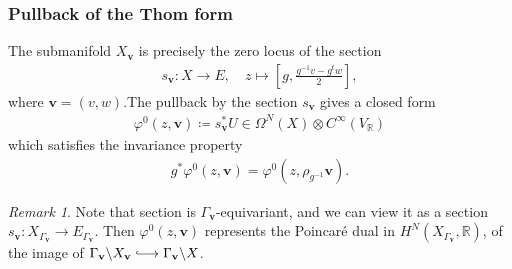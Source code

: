 \documentclass[twoside,a4paper,10pt]{article} %
\newcommand{\8}{\infty}
\newcommand{\vbf}{\mathbf{v}}
\newcommand{\R}{\mathbb{R}}
\newcommand{\hooklongrightarrow}{\lhook\joinrel\longrightarrow}
\theoremstyle{mytheoremstyle}
\theoremstyle{remark}
\newtheorem{rmk}{Remark}[section]
\numberwithin{equation}{section}
\begin{document}
\subsubsection{Pullback of the Thom form}The submanifold $X_\vbf$ is precisely the zero locus of the section
\begin{align} \label{sectionsv}
s_\vbf \colon X \longrightarrow E, \quad z \longmapsto \left [ g,\frac{g^{-1}v-g^t w}{2}\right ],
\end{align}
where $\vbf=(v,w)$.The pullback by the section $s_\vbf$ gives a closed form
\begin{align}
\varphi^0(z,\vbf)\coloneqq s_\vbf^\ast U \in \Omega^N(X) \otimes C^\8(V_\R)
\end{align} 
which satisfies the invariance property
\begin{align}
g^\ast \varphi^0(z,\vbf)=\varphi^0(z,\rho_{g^{-1}}\vbf).
\end{align}
\begin{rmk}
Note that section is $\Gamma_\vbf$-equivariant, and we can view it as a section $s_\vbf \colon X_{\Gamma_\vbf}  \longrightarrow E_{\Gamma_\vbf}$. Then $\varphi^0(z,\vbf)$ represents the Poincaré dual in $H^{N}(X_{\Gamma_\vbf},\R)$, of the image of $\Gamma_\vbf \backslash X_{\vbf} \hooklongrightarrow \Gamma_\vbf \backslash X$.
\end{rmk}
\end{document}
